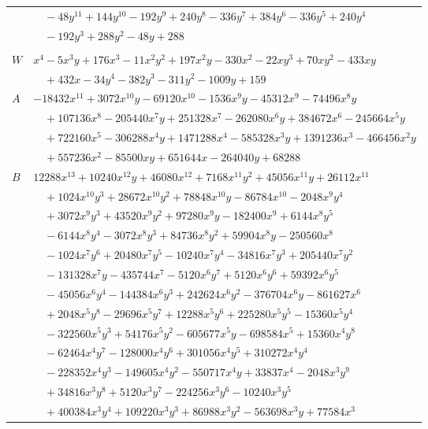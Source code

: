 \documentclass[11pt]{article}
\begin{document}
\begin{longtable}{@{}ll@{}}
 & $\quad -48y^{11}+144y^{10}-192y^{9}+240y^{8}-336y^{7}+384y^{6}-336y^{5}+240y^{4}$\\
 & $\quad -192y^{3}+288y^{2}-48y+288$\\
\addlinespace[3pt]
\multicolumn{2}{@{}l}{$i=1$, $m=16$, neighbours $0,15,16,18,20,21,23,24,87$}\\
$W$ & $x^{4}-5x^{3}y+176x^{3}-11x^{2}y^{2}+197x^{2}y-330x^{2}-22xy^{3}+70xy^{2}-433xy$\\
 & $\quad +432x-34y^{4}-382y^{3}-311y^{2}-1009y+159$\\
$A$ & $-18432x^{11}+3072x^{10}y-69120x^{10}-1536x^{9}y-45312x^{9}-74496x^{8}y$\\
 & $\quad +107136x^{8}-205440x^{7}y+251328x^{7}-262080x^{6}y+384672x^{6}-245664x^{5}y$\\
 & $\quad +722160x^{5}-306288x^{4}y+1471288x^{4}-585328x^{3}y+1391236x^{3}-466456x^{2}y$\\
 & $\quad +557236x^{2}-85500xy+651644x-264040y+68288$\\
$B$ & $12288x^{13}+10240x^{12}y+46080x^{12}+7168x^{11}y^{2}+45056x^{11}y+26112x^{11}$\\
 & $\quad +1024x^{10}y^{3}+28672x^{10}y^{2}+78848x^{10}y-86784x^{10}-2048x^{9}y^{4}$\\
 & $\quad +3072x^{9}y^{3}+43520x^{9}y^{2}+97280x^{9}y-182400x^{9}+6144x^{8}y^{5}$\\
 & $\quad -6144x^{8}y^{4}-3072x^{8}y^{3}+84736x^{8}y^{2}+59904x^{8}y-250560x^{8}$\\
 & $\quad -1024x^{7}y^{6}+20480x^{7}y^{5}-10240x^{7}y^{4}-34816x^{7}y^{3}+205440x^{7}y^{2}$\\
 & $\quad -131328x^{7}y-435744x^{7}-5120x^{6}y^{7}+5120x^{6}y^{6}+59392x^{6}y^{5}$\\
 & $\quad -45056x^{6}y^{4}-144384x^{6}y^{3}+242624x^{6}y^{2}-376704x^{6}y-861627x^{6}$\\
 & $\quad +2048x^{5}y^{8}-29696x^{5}y^{7}+12288x^{5}y^{6}+225280x^{5}y^{5}-15360x^{5}y^{4}$\\
 & $\quad -322560x^{5}y^{3}+54176x^{5}y^{2}-605677x^{5}y-698584x^{5}+15360x^{4}y^{8}$\\
 & $\quad -62464x^{4}y^{7}-128000x^{4}y^{6}+301056x^{4}y^{5}+310272x^{4}y^{4}$\\
 & $\quad -228352x^{4}y^{3}-149605x^{4}y^{2}-550717x^{4}y+33837x^{4}-2048x^{3}y^{9}$\\
 & $\quad +34816x^{3}y^{8}+5120x^{3}y^{7}-224256x^{3}y^{6}-10240x^{3}y^{5}$\\
 & $\quad +400384x^{3}y^{4}+109220x^{3}y^{3}+86988x^{3}y^{2}-563698x^{3}y+77584x^{3}$\\

\end{longtable}
\end{document}

